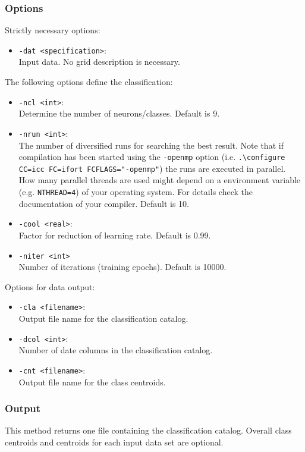 \documentclass[12pt, oneside, a4paper, headsepline, plainheadsepline]{scrbook}
\begin{document}
\subsubsection*{Options}
Strictly necessary options:
\begin{itemize}
 \item \verb+-dat <specification>+:\\ Input data. No grid description is necessary.
\end{itemize}
The following options define the classification:
\begin{itemize}
 \item \verb+-ncl <int>+:\\ 
 Determine the number of neurons/classes. Default is 9.  
 \item \verb+-nrun <int>+:\\ 	
 The number of diversified runs for searching the best result. Note that if compilation has been started using the \verb+-openmp+ option 
 (i.e. \verb+.\configure CC=icc FC=ifort FCFLAGS="-openmp"+) the runs are executed in parallel.
 How many parallel threads are used might depend on a environment variable (e.g. \verb+NTHREAD=4+)
 of your operating system. For details check the documentation of your compiler. Default is 10.
 \item \verb+-cool <real>+:\\ Factor for reduction of learning rate. Default is 0.99.
 \item \verb+-niter <int>+\\ Number of iterations (training epochs). Default is 10000. 
\end{itemize}
Options for data output:
\begin{itemize}
 \item \verb+-cla <filename>+:\\ Output file name for the classification catalog.
 \item \verb+-dcol <int>+:\\ Number of date columns in the classification catalog.
 \item \verb+-cnt <filename>+:\\ Output file name for the class centroids.
\end{itemize}

\subsubsection*{Output}
This method returns one file containing the classification catalog. 
Overall class centroids and centroids for each input data set are optional.
\end{document}
